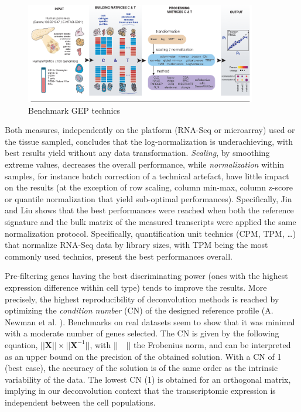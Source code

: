 \begin{figure}
\centering
\includegraphics[width=0.9\textwidth]{figures/benchmark_GEP_schema.PNG}
\caption{Benchmark GEP technics}
\end{figure}

Both measures, independently on the platform (\acrshort{RNA-Seq} or microarray) used
or the tissue sampled, concludes that the log-normalization is
underachieving, with best results yield without any data transformation.
\emph{Scaling}, by smoothing extreme values, decreases the overall
performance, while \emph{normalization} within samples, for instance
batch correction of a technical artefact, have little impact on the
results (at the exception of row scaling, column min-max, column z-score
or quantile normalization that yield sub-optimal performances).
Specifically, Jin and Liu \autocite{jin_liu21}
shows that the best performances were reached when both the reference
signature and the bulk matrix of the measured transcripts were applied
the same normalization protocol. Specifically, quantification unit
technics (CPM, TPM, \ldots) that normalize \acrshort{RNA-Seq} data by library sizes,
with TPM being the most commonly used technics, present the best
performances overall.

Pre-filtering genes having the best discriminating power (ones with the
highest expression difference within cell type) tends to improve the
results. More precisely, the highest reproducibility of deconvolution
methods is reached by optimizing the \emph{condition number} (CN) of the
designed reference profile (A. Newman et al.
\autocite{newman_etal15}). Benchmarks on real
datasets seem to show that it was minimal with a moderate number of
genes selected. The CN is given by the following equation,
\(||\boldsymbol{X}|| \times ||\boldsymbol{X}^{-1}||\), with \(||\quad||\) the
Frobenius norm, and can be interpreted as an upper bound on the
precision of the obtained solution. With a CN of 1 (best case), the
accuracy of the solution is of the same order as the intrinsic
variability of the data. The lowest CN (1) is obtained for an orthogonal
matrix, implying in our deconvolution context that the transcriptomic
expression is independent between the cell populations.

